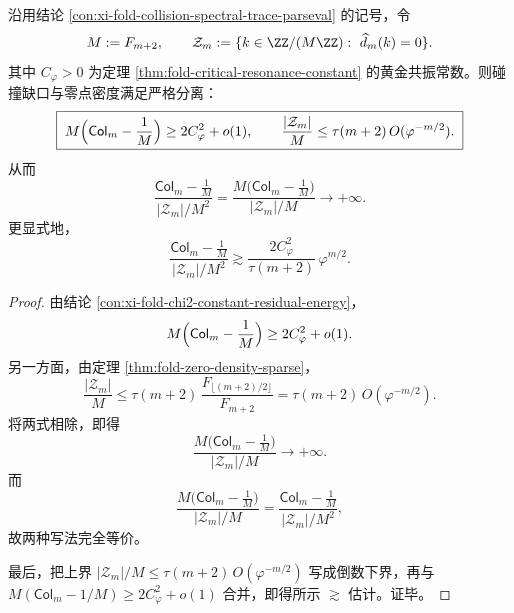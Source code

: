\begin{theorem}[零点几何对碰撞缺口的指数失明]\label{thm:xi-fold-zero-geometry-collision-gap-blindness}
沿用结论 \ref{con:xi-fold-collision-spectral-trace-parseval} 的记号，令
\[
M:=F_{m+2},
\qquad
\mathcal Z_m:=\{k\in \ZZ/(M\ZZ):\ \widehat d_m(k)=0\}.
\]
其中 \(C_\varphi>0\) 为定理 \ref{thm:fold-critical-resonance-constant} 的黄金共振常数。则碰撞缺口与零点密度满足严格分离：
\[
\boxed{\;
M\Bigl(\mathsf{Col}_m-\frac1M\Bigr)
\ge
2C_\varphi^2+o(1),
\qquad
\frac{|\mathcal Z_m|}{M}
\le
\tau(m+2)\,O(\varphi^{-m/2}).\;}
\]
从而
\[
\boxed{\;
\frac{\mathsf{Col}_m-\frac1M}{|\mathcal Z_m|/M^2}
=
\frac{M\bigl(\mathsf{Col}_m-\frac1M\bigr)}{|\mathcal Z_m|/M}
\longrightarrow +\infty.\;}
\]
更显式地，
\[
\boxed{\;
\frac{\mathsf{Col}_m-\frac1M}{|\mathcal Z_m|/M^2}
\gtrsim
\frac{2C_\varphi^2}{\tau(m+2)}\,\varphi^{m/2}.\;}
\]
\end{theorem}
\begin{proof}
由结论 \ref{con:xi-fold-chi2-constant-residual-energy}，
\[
M\Bigl(\mathsf{Col}_m-\frac1M\Bigr)\ge 2C_\varphi^2+o(1).
\]
另一方面，由定理 \ref{thm:fold-zero-density-sparse}，
\[
\frac{|\mathcal Z_m|}{M}
\le
\tau(m+2)\,\frac{F_{\lfloor (m+2)/2\rfloor}}{F_{m+2}}
=
\tau(m+2)\,O(\varphi^{-m/2}).
\]
将两式相除，即得
\[
\frac{M\bigl(\mathsf{Col}_m-\frac1M\bigr)}{|\mathcal Z_m|/M}
\to +\infty.
\]
而
\[
\frac{M\bigl(\mathsf{Col}_m-\frac1M\bigr)}{|\mathcal Z_m|/M}
=
\frac{\mathsf{Col}_m-\frac1M}{|\mathcal Z_m|/M^2},
\]
故两种写法完全等价。

最后，把上界
\(
|\mathcal Z_m|/M\le \tau(m+2)\,O(\varphi^{-m/2})
\)
写成倒数下界，再与
\(
M(\mathsf{Col}_m-1/M)\ge 2C_\varphi^2+o(1)
\)
合并，即得所示 \(\gtrsim\) 估计。证毕。
\end{proof}

